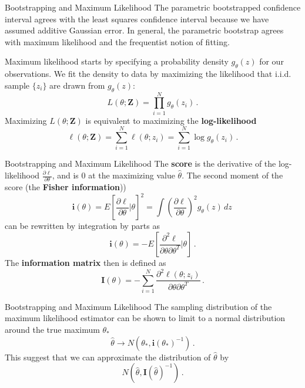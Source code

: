 \documentclass[10pt, table, dvipsnames,xcdraw, handout]{beamer}
\begin{document}
\begin{frame}[fragile]{Bootstrapping and Maximum Likelihood}
The parametric bootstrapped confidence interval agrees with the least squares confidence interval because we have assumed additive Gaussian error. In general, the parametric bootstrap agrees with maximum likelihood and the frequentist notion of fitting. \pause

Maximum likelihood starts by specifying a probability density $g_\theta(z)$ for our observations. We fit the density to data by maximizing the likelihood that i.i.d. sample $\{z_i\}$ are drawn from $g_\theta(z)$:
$$
L(\theta;\mathbf{Z}) = \prod_{i=1}^Ng_\theta(z_i)\,.
$$\pause
Maximizing $L(\theta;\mathbf{Z}) $ is equivalent to maximizing the \textbf{log-likelihood}
$$
\ell(\theta;\mathbf{Z}) = \sum_{i=1}^N \ell(\theta;z_i) =  \sum_{i=1}^N \log g_\theta(z_i)\,.
$$

\end{frame}



\begin{frame}[fragile]{Bootstrapping and Maximum Likelihood}
The \textbf{score} is the derivative of the log-likelihood $\frac{\partial \ell}{\partial \theta}$, and is 0 at the maximizing value $\hat{\theta}$. \pause The second moment of the score (the \textbf{Fisher information}))
$$
\textbf{i}(\theta) = E\left[ \frac{\partial \ell}{\partial \theta} \big| \theta \right]^2 = \int \left( \frac{\partial \ell}{\partial \theta}  \right)^2 g_\theta(z)\,dz\,
$$\pause
can be rewritten by integration by parts as
$$
\textbf{i}(\theta) = -E\left[ \frac{\partial^2 \ell}{\partial \theta\partial \theta^T} \big| \theta \right]\,.
$$\pause
The \textbf{information matrix} then is defined as
$$
\textbf{I}(\theta) = -\sum_{i=1}^N\frac{\partial^2 \ell(\theta;z_i)}{\partial \theta \partial\theta^T}\,.
$$
\end{frame}



\begin{frame}[fragile]{Bootstrapping and Maximum Likelihood}
The sampling distribution of the maximum likelihood estimator can be shown to limit to a normal distribution around the true maximum $\theta_*$
$$
\hat{\theta} \to N(\theta_*, \textbf{i}(\theta_*)^{-1})\,.
$$\pause
This suggest that we can approximate the distribution of $\hat{\theta}$ by
$$
N(\hat{\theta}, \textbf{I}(\hat{\theta})^{-1})\,.
$$
\end{frame}
\end{document}

